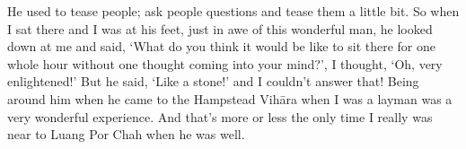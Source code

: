He used to tease people; ask people questions and tease them a little
bit. So when I sat there and I was at his feet, just in awe of this
wonderful man, he looked down at me and said, `What do you think it
would be like to sit there for one whole hour without one thought coming
into your mind?', I thought, `Oh, very enlightened!' But he said, `Like
a stone!' and I couldn't answer that! Being around him when he came to
the Hampstead Vihāra when I was a layman was a very wonderful
experience. And that's more or less the only time I really was near to
Luang Por Chah when he was well. 

